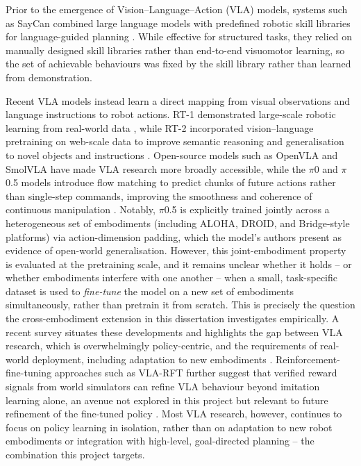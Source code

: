 \documentclass[12pt]{article}
\begin{document}
Prior to the emergence of Vision--Language--Action (VLA) models, systems such as SayCan combined large language models with predefined robotic skill libraries for language-guided planning \cite{ahn2022icanisay}. While effective for structured tasks, they relied on manually designed skill libraries rather than end-to-end visuomotor learning, so the set of achievable behaviours was fixed by the skill library rather than learned from demonstration.

Recent VLA models instead learn a direct mapping from visual observations and language instructions to robot actions. RT-1 demonstrated large-scale robotic learning from real-world data \cite{brohan2023rt1roboticstransformerrealworld}, while RT-2 incorporated vision--language pretraining on web-scale data to improve semantic reasoning and generalisation to novel objects and instructions \cite{brohan2023rt2visionlanguageactionmodelstransfer}. Open-source models such as OpenVLA \cite{kim2024openvlaopensourcevisionlanguageactionmodel} and SmolVLA \cite{shukor2025smolvlavisionlanguageactionmodelaffordable} have made VLA research more broadly accessible, while the $\pi$0 and $\pi$0.5 models introduce flow matching to predict chunks of future actions rather than single-step commands, improving the smoothness and coherence of continuous manipulation \cite{black2026pi0visionlanguageactionflowmodel, intelligence2025pi05visionlanguageactionmodelopenworld}. Notably, $\pi$0.5 is explicitly trained jointly across a heterogeneous set of embodiments (including ALOHA, DROID, and Bridge-style platforms) via action-dimension padding, which the model's authors present as evidence of open-world generalisation. However, this joint-embodiment property is evaluated at the pretraining scale, and it remains unclear whether it holds -- or whether embodiments interfere with one another -- when a small, task-specific dataset is used to \emph{fine-tune} the model on a new set of embodiments simultaneously, rather than pretrain it from scratch. This is precisely the question the cross-embodiment extension in this dissertation investigates empirically. A recent survey situates these developments and highlights the gap between VLA research, which is overwhelmingly policy-centric, and the requirements of real-world deployment, including adaptation to new embodiments \cite{11164279}. Reinforcement-fine-tuning approaches such as VLA-RFT further suggest that verified reward signals from world simulators can refine VLA behaviour beyond imitation learning alone, an avenue not explored in this project but relevant to future refinement of the fine-tuned policy \cite{li2025vla}. Most VLA research, however, continues to focus on policy learning in isolation, rather than on adaptation to new robot embodiments or integration with high-level, goal-directed planning -- the combination this project targets.
\end{document}
